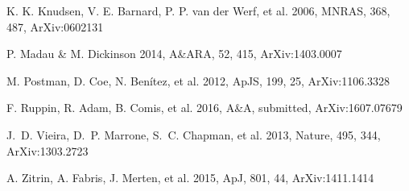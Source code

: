\documentclass[11pt,a4paper,twoside,graphicx,color]{article}
\begin{document}
\begin{thebibliography}{9}
{
K. K. Knudsen, V. E. Barnard, P. P. van der Werf, et al. 2006, MNRAS, 368, 487, ArXiv:0602131

P. Madau \& M. Dickinson 2014, A\&ARA, 52, 415, ArXiv:1403.0007

M. Postman, D. Coe, N. Ben\'itez, et al. 2012, ApJS, 199, 25, ArXiv:1106.3328

F. Ruppin, R. Adam, B. Comis, et al. 2016, A\&A, submitted, ArXiv:1607.07679

J.~D. Vieira, D.~P. Marrone, S.~C. Chapman, et al. 2013, Nature, 495, 344, ArXiv:1303.2723

A. Zitrin, A. Fabris, J. Merten, et al. 2015, ApJ, 801, 44, ArXiv:1411.1414

}
\end{thebibliography}
\end{document}
